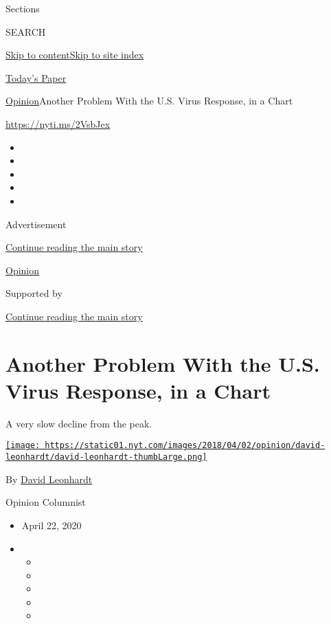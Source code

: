 Sections

SEARCH

\protect\hyperlink{site-content}{Skip to
content}\protect\hyperlink{site-index}{Skip to site index}

\href{https://myaccount.nytimes.com/auth/login?response_type=cookie\&client_id=vi}{}

\href{https://www.nytimes.com/section/todayspaper}{Today's Paper}

\href{/section/opinion}{Opinion}\textbar{}Another Problem With the U.S.
Virus Response, in a Chart

\href{https://nyti.ms/2VsbJex}{https://nyti.ms/2VsbJex}

\begin{itemize}
\item
\item
\item
\item
\item
\end{itemize}

Advertisement

\protect\hyperlink{after-top}{Continue reading the main story}

\href{/section/opinion}{Opinion}

Supported by

\protect\hyperlink{after-sponsor}{Continue reading the main story}

\hypertarget{another-problem-with-the-us-virus-response-in-a-chart}{%
\section{Another Problem With the U.S. Virus Response, in a
Chart}\label{another-problem-with-the-us-virus-response-in-a-chart}}

A very slow decline from the peak.

\href{https://www.nytimes.com/by/david-leonhardt}{\texttt{[image: https://static01.nyt.com/images/2018/04/02/opinion/david-leonhardt/david-leonhardt-thumbLarge.png]}}

By \href{https://www.nytimes.com/by/david-leonhardt}{David Leonhardt}

Opinion Columnist

\begin{itemize}
\item
  April 22, 2020
\item
  \begin{itemize}
  \item
  \item
  \item
  \item
  \item
  \end{itemize}
\end{itemize}

